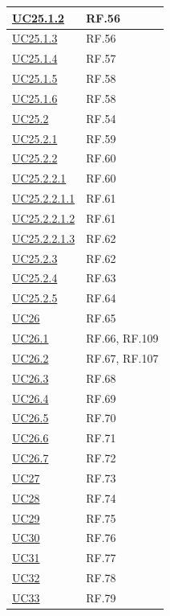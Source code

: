 \documentclass[12pt, a4paper]{article}
\begin{document}
\begin{longtable}{|l|p{}|}
\hyperref[uc:25.1.2]{UC25.1.2} & RF.56 \\ \hline
\hyperref[uc:25.1.3]{UC25.1.3} & RF.56 \\ \hline
\hyperref[uc:25.1.4]{UC25.1.4} & RF.57 \\ \hline
\hyperref[uc:25.1.5]{UC25.1.5} & RF.58 \\ \hline
\hyperref[uc:25.1.6]{UC25.1.6} & RF.58 \\ \hline
\hyperref[uc:25.2]{UC25.2} & RF.54 \\ \hline
\hyperref[uc:25.2.1]{UC25.2.1} & RF.59 \\ \hline
\hyperref[uc:25.2.2]{UC25.2.2} & RF.60 \\ \hline
\hyperref[uc:25.2.2.1]{UC25.2.2.1} & RF.60 \\ \hline
\hyperref[uc:25.2.2.1.1]{UC25.2.2.1.1} & RF.61 \\ \hline
\hyperref[uc:25.2.2.1.2]{UC25.2.2.1.2} & RF.61 \\ \hline
\hyperref[uc:25.2.2.1.3]{UC25.2.2.1.3} & RF.62 \\ \hline
\hyperref[uc:25.2.3]{UC25.2.3} & RF.62 \\ \hline
\hyperref[uc:25.2.4]{UC25.2.4} & RF.63 \\ \hline
\hyperref[uc:25.2.5]{UC25.2.5} & RF.64 \\ \hline
\hyperref[uc:26]{UC26} & RF.65 \\ \hline
\hyperref[uc:26.1]{UC26.1} & RF.66, RF.109 \\ \hline
\hyperref[uc:26.2]{UC26.2} & RF.67, RF.107 \\ \hline
\hyperref[uc:26.3]{UC26.3} & RF.68 \\ \hline
\hyperref[uc:26.4]{UC26.4} & RF.69 \\ \hline
\hyperref[uc:26.5]{UC26.5} & RF.70 \\ \hline
\hyperref[uc:26.6]{UC26.6} & RF.71 \\ \hline
\hyperref[uc:26.7]{UC26.7} & RF.72 \\ \hline
\hyperref[uc:27]{UC27} & RF.73 \\ \hline
\hyperref[uc:28]{UC28} & RF.74 \\ \hline
\hyperref[uc:29]{UC29} & RF.75 \\ \hline
\hyperref[uc:30]{UC30} & RF.76 \\ \hline
\hyperref[uc:31]{UC31} & RF.77 \\ \hline
\hyperref[uc:32]{UC32} & RF.78 \\ \hline
\hyperref[uc:33]{UC33} & RF.79 \\ \hline

\end{longtable}
\end{document}

